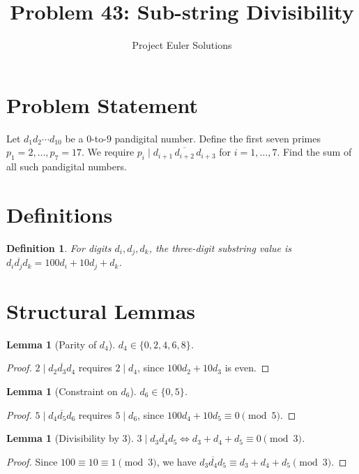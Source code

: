 \documentclass[12pt]{article}
\title{Problem 43: Sub-string Divisibility}
\author{Project Euler Solutions}
\date{}
\newtheorem{lemma}[theorem]{Lemma}
\newtheorem{definition}[theorem]{Definition}
\begin{document}
\maketitle

\section{Problem Statement}

Let $d_1 d_2 \cdots d_{10}$ be a $0$-to-$9$ pandigital number. Define the first seven primes $p_1 = 2, \ldots, p_7 = 17$. We require $p_i \mid \overline{d_{i+1}\,d_{i+2}\,d_{i+3}}$ for $i = 1, \ldots, 7$. Find the sum of all such pandigital numbers.

\section{Definitions}

\begin{definition}
For digits $d_i, d_j, d_k$, the \emph{three-digit substring value} is $\overline{d_i d_j d_k} = 100 d_i + 10 d_j + d_k$.
\end{definition}

\section{Structural Lemmas}

\begin{lemma}[Parity of $d_4$]
$d_4 \in \{0, 2, 4, 6, 8\}$.
\end{lemma}

\begin{proof}
$2 \mid \overline{d_2 d_3 d_4}$ requires $2 \mid d_4$, since $100 d_2 + 10 d_3$ is even.
\end{proof}

\begin{lemma}[Constraint on $d_6$]
$d_6 \in \{0, 5\}$.
\end{lemma}

\begin{proof}
$5 \mid \overline{d_4 d_5 d_6}$ requires $5 \mid d_6$, since $100 d_4 + 10 d_5 \equiv 0 \pmod{5}$.
\end{proof}

\begin{lemma}[Divisibility by 3]
$3 \mid \overline{d_3 d_4 d_5} \iff d_3 + d_4 + d_5 \equiv 0 \pmod{3}$.
\end{lemma}

\begin{proof}
Since $100 \equiv 10 \equiv 1 \pmod{3}$, we have $\overline{d_3 d_4 d_5} \equiv d_3 + d_4 + d_5 \pmod{3}$.
\end{proof}
\end{document}
